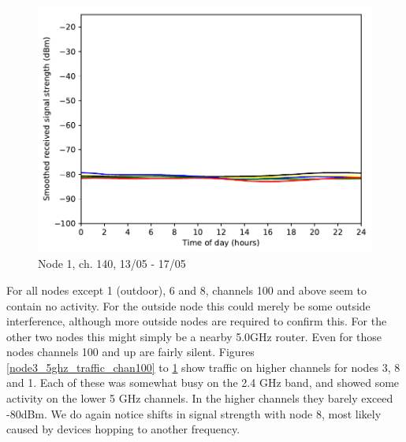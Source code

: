 \documentclass[a4paper, 11pt]{article}
\begin{document}
\begin{figure}[ht]
\begin{minipage}{0.47\textwidth}
\centering
\includegraphics[width=\textwidth]{images/5_GHz/node1_2017-05-17_chan140_image.pdf}
\caption{Node 1, ch. 140, 13/05 - 17/05}
\label{node1_5ghz_traffic_chan140}
\end{minipage}\hfill
\end{figure}
For all nodes except 1 (outdoor), 6 and 8, channels 100 and above seem to contain no activity. For the outside node this could merely be some outside interference, although more outside nodes are required to confirm this. For the other two nodes this might simply be a nearby 5.0GHz router. Even for those nodes channels 100 and up are fairly silent.
Figures \ref{node3_5ghz_traffic_chan100} to \ref{node1_5ghz_traffic_chan140} show traffic on higher channels for nodes 3, 8 and 1. Each of these was somewhat busy on the 2.4 GHz band, and showed some activity on the lower 5 GHz channels. In the higher channels they barely exceed -80dBm. We do again notice shifts in signal strength with node 8, most likely caused by devices hopping to another frequency.
\end{document}

